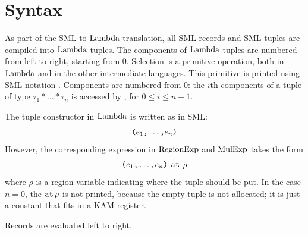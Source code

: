 \documentclass[12pt]{book}
\begin{document}
\section{Syntax}
As part of the SML to $\hbox{\rm Lambda}$ translation, all SML records and SML tuples are compiled into
$\hbox{\rm Lambda}$ tuples. The components of $\hbox{\rm Lambda}$ tuples are numbered from left to right, starting from 0.
Selection is a primitive operation, both in $\hbox{\rm Lambda}$ and in the other
intermediate languages. This primitive is printed using SML notation 
. Components are numbered from 0: the $i$th components of
a tuple of type $\tau_1\ast\ldots\ast\tau_n$ is accessed by
, for $0\leq i\leq n-1$. 

The tuple constructor in $\hbox{\rm Lambda}$ is written as in SML:
$$\hbox{\tt (}e_1\hbox{\tt ,}\ldots\hbox{\tt ,}e_n\hbox{\tt )}$$
However, the corresponding expression in $\hbox{\rm RegionExp}$ and $\hbox{\rm MulExp}$ takes the form
$$\hbox{\tt (}e_1\hbox{\tt ,}\ldots\hbox{\tt ,}e_n\hbox{\tt )}\,\mathbin{\hbox{\tt at}}\,\rho$$
where $\rho$ is a 
%
region variable indicating where the tuple should be put.  In the case
$n=0$, the $\mathbin{\hbox{\tt at}}\,\rho$ is not printed, because the empty tuple is not
allocated; it is just a constant that fits in a KAM
register.

Records are evaluated left to right.
\end{document}
